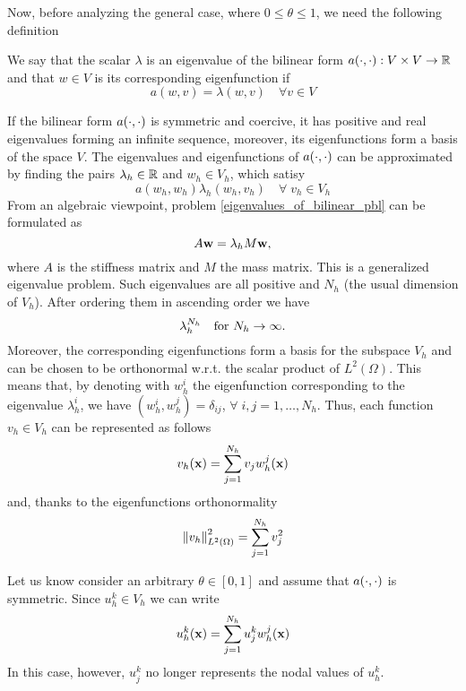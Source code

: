 Now, before analyzing the general case, where \(0 \leq \theta \leq 1\), we need the following definition 
\begin{definition}
    We say that the scalar \(\lambda\) is an eigenvalue of the bilinear form \(a(\cdot, \cdot): V \times V \to \mathbb{R}\) and that \(w \in V\) is its corresponding eigenfunction if 
    \[
        a(w,v) = \lambda(w,v) \quad \forall v \in V    
    \]
\end{definition}
If the bilinear form \(a(\cdot, \cdot)\) is symmetric and coercive, it has positive and real eigenvalues forming an infinite sequence, moreover, its eigenfunctions form a basis of the space \(V\). The eigenvalues and eigenfunctions of \(a(\cdot, \cdot)\) can be approximated by finding the pairs \(\lambda_h \in \mathbb{R}\) and \(w_h \in V_h\), which satisy 
\begin{equation}
    a(w_h, w_h) \lambda_h (w_h, v_h) \quad \forall \; v_h \in V_h
    \label{eigenvalues_of_bilinear_pbl}
\end{equation}
From an algebraic viewpoint, problem \eqref{eigenvalues_of_bilinear_pbl} can be formulated as 
\[
    A\textbf{w} = \lambda_h M \textbf{w},
\]
where \(A\) is the stiffness matrix and \(M\) the mass matrix. This is a generalized eigenvalue problem. Such eigenvalues are all positive and \(N_h\) (the usual dimension of \(V_h\)). After ordering them in ascending order we have
\[
    \lambda_h^{N_h} \quad \text{for } N_h \to \infty.
\]
Moreover, the corresponding eigenfunctions form a basis for the subspace \(V_h\) and can be chosen to be orthonormal w.r.t. the scalar product of \(L^2(\Omega)\). This means that, by denoting with \(w^i_h\) the eigenfunction corresponding to the eigenvalue \(\lambda^i_h\), we have \((w^i_h, w_h^j) = \delta_{ij}\), \(\forall \; i,j = 1,\ldots,N_h\). Thus, each function \(v_h \in V_h\) can be represented as follows 
\[
    v_h(\textbf{x}) = \sum_{j=1}^{N_h} v_j w^j_h(\textbf{x})
\]
and, thanks to the eigenfunctions orthonormality
\begin{equation}
    \norm{v_h}_{L^2(\Omega)}^2 = \sum_{j=1}^{N_h} v_j^2
    \label{orthonormality_pbl}
\end{equation}

Let us know consider an arbitrary \(\theta \in [0,1]\) and assume that \(a(\cdot, \cdot)\) is symmetric. Since \(u_h^k \in V_h\) we can write 
\[
    u_h^k(\textbf{x}) = \sum_{j=1}^{N_h} u^k_j w^j_h(\textbf{x})
\]
In this case, however, \(u_j^k\) no longer represents the nodal values of \(u_h^k\).

